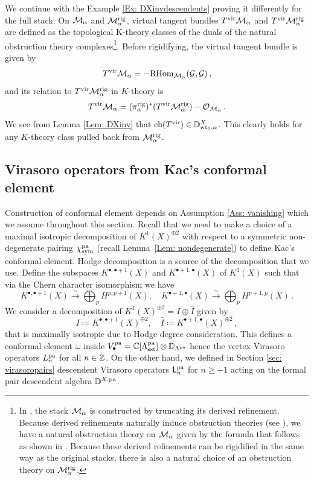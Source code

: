 \documentclass[a4paper, 12pt]{amsart}
\begin{document}
\begin{example}\label{ex: invdescendents}
We continue with the Example \ref{Ex: DXinvdescendents} proving it differently for the full stack.  On ${\mathcal M}_{\alpha}$ and ${\mathcal M}^{\mathrm{rig}}_{\alpha}$, virtual tangent bundles $T^{\mathrm{vir}}{\mathcal M}_{\alpha}$ and $T^{\mathrm{vir}}{\mathcal M}_{\alpha}^{\mathrm{rig}}$ are defined as the topological K-theory classes of the duals of the natural obstruction theory complexes\footnote{In \cite{TV07}, the stack ${\mathcal M}_{\alpha}$ is constructed by truncating its derived refinement. Because derived refinements naturally induce obstruction theories (see \cite[Proposition 1.2]{STV}), we have a natural obstruction theory on ${\mathcal M}_{\alpha}$ given by the formula that follows as shown in \cite[Corollary 3.29]{TV07}. Because these derived refinements can be rigidified in the same way as the original stacks, there is also a natural choice of an obstruction theory on ${\mathcal M}^{\mathrm{rig}}_{\alpha}$.}.  Before rigidifying, the virtual tangent bundle is given by $$T^{\mathrm{vir}}{\mathcal M}_{\alpha}=-\mathrm{RHom}_{{\mathcal M}_\alpha}({\mathcal G},{\mathcal G})\,,$$
and its relation to  $T^{\mathrm{vir}}{\mathcal M}^{\mathrm{rig}}_{\alpha}$ in $K$-theory is
$$
T^{\mathrm{vir}}{\mathcal M}_\alpha = (\pi^{\mathrm{rig}}_\alpha)^*(T^{\mathrm{vir}}{\mathcal M}^{\mathrm{rig}}_\alpha) - {\mathcal O}_{{\mathcal M}_\alpha}\,.
$$
  We see from Lemma \ref{Lem: DXinv} that $\mathrm{ch}(T^{\mathrm{vir}})\in {\mathbb{D}}^X_{{\mathrm{wt}_0}, \alpha}$. This clearly holds for any $K$-theory class pulled back from ${\mathcal M}^{\mathrm{rig}}_{\alpha}$.
\end{example}






\subsection{Virasoro operators from Kac's conformal element}
\label{sec: virasorocomparison}

Construction of conformal element depends on Assumption \ref{Ass: vanishing} which we assume throughout this section. Recall that we need to make a choice of a maximal isotropic decomposition of $K^1(X)^{\oplus 2}$ with respect to a symmetric non-degenerate pairing $\chi^{\mathop{\rm pa}\nolimits}_{\text{sym}}$ (recall Lemma~\ref{Lem: nondegenerate}) to define Kac's conformal element. Hodge decomposition is a source of the decomposition that we use. Define the subspaces $K^{\bullet,\bullet+1}(X)$ and $K^{\bullet+1,\bullet}(X)$ of $K^1(X)$ such that via the Chern character isomorphism we have 
$$K^{\bullet,\bullet+1}(X)\xrightarrow{\sim}\bigoplus_{p}H^{p,p+1}(X),\quad K^{\bullet+1,\bullet}(X)\xrightarrow{\sim}\bigoplus_{p}H^{p+1,p}(X)\,.
$$
We consider a decomposition of $K^1(X)^{\oplus 2}=I\oplus \hat{I}$ given by 
\begin{equation}\label{Hodge isotropic decomposition}
    I\coloneqq K^{\bullet,\bullet+1}(X)^{\oplus 2},\quad \hat{I}\coloneqq K^{\bullet+1,\bullet}(X)^{\oplus 2}\,,
\end{equation}
that is maximally isotropic due to Hodge degree consideration. This defines a conformal element $\omega$ inside $V_\bullet^{\mathop{\rm pa}\nolimits}={\mathbb{C}}[\Lambda^{\mathop{\rm pa}\nolimits}_{\text{sst}}]\otimes {\mathbb{D}}_{\Lambda^{\mathop{\rm pa}\nolimits}}$ hence the vertex Virasoro operators $L_n^{\mathop{\rm pa}\nolimits}$ for all $n\in{\mathbb{Z}}$. On the other hand, we defined in Section \ref{sec: virasoropairs} descendent Virasoro operators ${\mathsf{L}}_n^{\mathop{\rm pa}\nolimits}$ for $n\geq -1$ acting on the formal pair descendent algebra ${\mathbb{D}}^{X,\mathop{\rm pa}\nolimits}$. 
\end{document}
